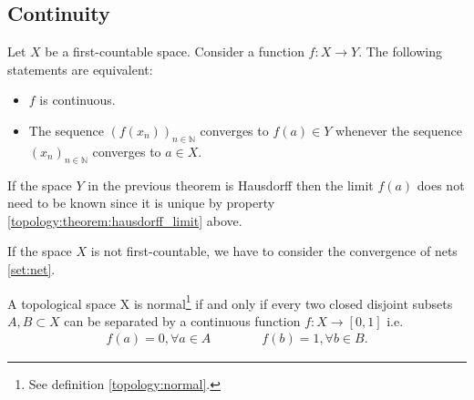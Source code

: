 \subsection{Continuity}



    \begin{property}[Continuity]
        Let $X$ be a first-countable space. Consider a function $f:X\rightarrow Y$. The following statements are equivalent:
        \begin{itemize}
            \item $f$ is continuous.
            \item The sequence $(f(x_n))_{n\in\mathbb{N}}$ converges to $f(a)\in Y$ whenever the sequence $(x_n)_{n\in\mathbb{N}}$ converges to $a\in X$.
        \end{itemize}
    \end{property}
    \begin{result}
       If the space $Y$ in the previous theorem is Hausdorff then the limit $f(a)$ does not need to be known since it is unique by property \ref{topology:theorem:hausdorff_limit} above.
    \end{result}
    \begin{remark}
        If the space $X$ is not first-countable, we have to consider the convergence of nets \ref{set:net}.
    \end{remark}

    \begin{theorem}\label{topology:urysohns_lemma}
        A topological space X is normal\footnote{See definition \ref{topology:normal}.} if and only if every two closed disjoint subsets $A, B\subset X$ can be separated by a continuous function $f:X\rightarrow [0, 1]$ i.e.
        \begin{gather}
            f(a) = 0, \forall a\in A\qquad\qquad f(b) = 1, \forall b\in B.
        \end{gather}
    \end{theorem}

